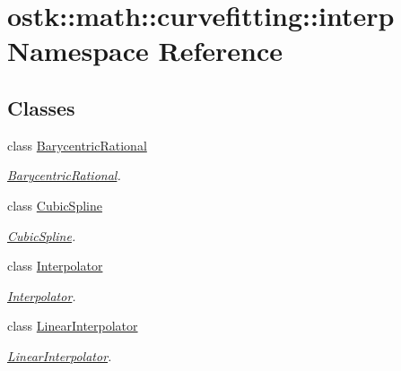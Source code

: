 \hypertarget{namespaceostk_1_1math_1_1curvefitting_1_1interp}{}\section{ostk\+:\+:math\+:\+:curvefitting\+:\+:interp Namespace Reference}
\label{namespaceostk_1_1math_1_1curvefitting_1_1interp}
\subsection*{Classes}
\begin{DoxyCompactItemize}
\item 
class \hyperlink{classostk_1_1math_1_1curvefitting_1_1interp_1_1_barycentric_rational}{Barycentric\+Rational}
\begin{DoxyCompactList}\small\item\em \hyperlink{classostk_1_1math_1_1curvefitting_1_1interp_1_1_barycentric_rational}{Barycentric\+Rational}. \end{DoxyCompactList}\item 
class \hyperlink{classostk_1_1math_1_1curvefitting_1_1interp_1_1_cubic_spline}{Cubic\+Spline}
\begin{DoxyCompactList}\small\item\em \hyperlink{classostk_1_1math_1_1curvefitting_1_1interp_1_1_cubic_spline}{Cubic\+Spline}. \end{DoxyCompactList}\item 
class \hyperlink{classostk_1_1math_1_1curvefitting_1_1interp_1_1_interpolator}{Interpolator}
\begin{DoxyCompactList}\small\item\em \hyperlink{classostk_1_1math_1_1curvefitting_1_1interp_1_1_interpolator}{Interpolator}. \end{DoxyCompactList}\item 
class \hyperlink{classostk_1_1math_1_1curvefitting_1_1interp_1_1_linear_interpolator}{Linear\+Interpolator}
\begin{DoxyCompactList}\small\item\em \hyperlink{classostk_1_1math_1_1curvefitting_1_1interp_1_1_linear_interpolator}{Linear\+Interpolator}. \end{DoxyCompactList}\end{DoxyCompactItemize}
